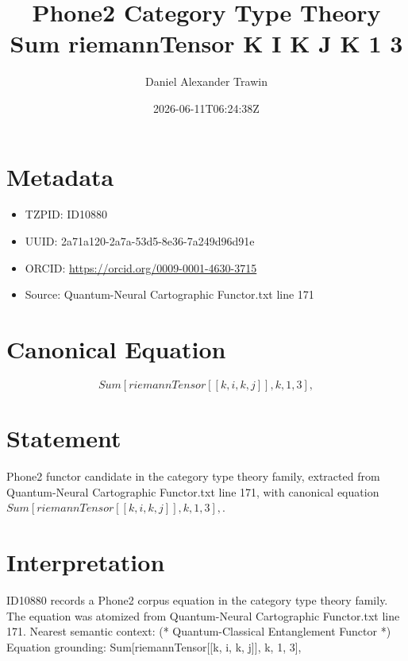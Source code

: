 \documentclass[11pt]{article}
\title{Phone2 Category Type Theory Sum riemannTensor K I K J K 1 3}
\author{Daniel Alexander Trawin}
\date{2026-06-11T06:24:38Z}
\begin{document}
\maketitle
\section*{Metadata}
\begin{itemize}
\item TZPID: ID10880
\item UUID: 2a71a120-2a7a-53d5-8e36-7a249d96d91e
\item ORCID: \url{https://orcid.org/0009-0001-4630-3715}
\item Source: Quantum-Neural Cartographic Functor.txt line 171
\end{itemize}
\section*{Canonical Equation}
\[
Sum[riemannTensor[[k, i, k, j]], {k, 1, 3}],
\]
\section*{Statement}
Phone2 functor candidate in the category type theory family, extracted from Quantum-Neural Cartographic Functor.txt line 171, with canonical equation $Sum[riemannTensor[[k, i, k, j]], {k, 1, 3}],$.
\section*{Interpretation}
ID10880 records a Phone2 corpus equation in the category type theory family. The equation was atomized from Quantum-Neural Cartographic Functor.txt line 171. Nearest semantic context: (* Quantum-Classical Entanglement Functor *) Equation grounding: Sum[riemannTensor[[k, i, k, j]], {k, 1, 3}],
\end{document}
